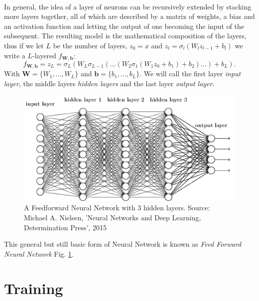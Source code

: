 \documentclass[LaM,binding=0.6cm]{./packages/sapthesis/sapthesis}
\begin{document}
            \paragraph{}
            In general, the idea of a layer of neurons can be recursively extended by stacking more layers together, all of which are described by a matrix of weights, a bias and an activation function
            and letting the output of one becoming the input of the subsequent.
            The resulting model is the mathematical composition of the layers, thus if we let $ L $ be the number of layers, $ z_0 = x $ and $ z_l = \sigma_l\left(W_{l}z_{l-1} + b_l\right)$
            we write a $L$-layered $f_{\mathbf{W}, \mathbf{b}}$:
            \begin{equation}
                f_{\mathbf{W}, \mathbf{b}} = z_L = \sigma_{L}\left(W_{L}\sigma_{L-1}\left(\ldots\left(W_2\sigma_{1}\left(W_{1}z_{0} +b_1\right)+ b_2\right)\ldots\right)+ b_{L}\right).
            \end{equation}
            With $ \mathbf{W} = \{W_1, \ldots, W_{L}\} $ and $ \mathbf{b}= \{b_1, \ldots, b_{L}\} $. We will call the first layer \textit{input layer}, the middle layers \textit{hidden layers}
            and the last layer \textit{output layer}.
            \begin{figure}[h]
                \centering
                \includegraphics[scale=0.5]{fnn}
                \caption{A Feedforward Neural Network with 3 hidden layers. Source: Michael A. Nielsen, 'Neural Networks and Deep Learning, Determination Press', 2015}
                \label{fig:fnn}
            \end{figure}
            This general but still basic form of Neural Network is known as \textit{Feed Forward Neural Network} Fig. \ref{fig:fnn}. 
        \section{Training}
\end{document}
